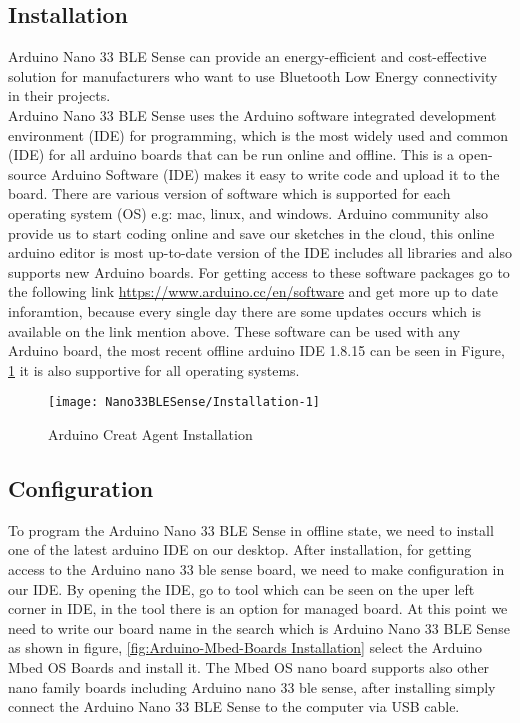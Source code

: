\subsection{Installation}

Arduino Nano 33 BLE Sense can provide an energy-efficient and cost-effective solution for manufacturers who want to use Bluetooth Low Energy connectivity in their projects.\\

Arduino Nano 33 BLE Sense uses the Arduino software integrated development environment (IDE) for programming, which is the most widely used and common (IDE) for all arduino boards that can be run online and offline. This is a open-source Arduino Software (IDE) makes it easy to write code and upload it to the board. There are various version of software which is supported for each operating system (OS) e.g: mac, linux, and windows. Arduino community also provide us to start coding online and save our sketches in the cloud, this online arduino editor is most up-to-date version of the IDE includes all libraries and also supports new Arduino boards. For getting access to these software packages go to the following link \url{https://www.arduino.cc/en/software}  and get more up to date inforamtion, because every single day there are some updates occurs which is available on the link mention above. These software can be used with any Arduino board, the most recent offline arduino IDE 1.8.15 can be seen in Figure, \ref{fig:arduino-creat-agent-installieren} it is also supportive for all operating systems.

\begin{figure}[h]
	\centering
	\texttt{[image: Nano33BLESense/Installation-1]}
	\caption{Arduino Creat Agent Installation}
	\label{fig:arduino-creat-agent-installieren}
\end{figure}


\subsection{Configuration}

To program the Arduino Nano 33 BLE Sense in offline state, we need to install one of the latest arduino IDE on our desktop. After installation, for getting access to the Arduino nano 33 ble sense board, we need to make configuration in our IDE. By opening the IDE, go to tool which can be seen on the uper left corner in IDE, in the tool there is an option for managed board. At this point we need to write our board name in the search which is Arduino Nano 33 BLE Sense as shown in figure, \ref {fig:Arduino-Mbed-Boards Installation} select the Arduino Mbed OS Boards and install it. The Mbed OS nano board supports also other nano family boards including Arduino nano 33 ble sense, after installing simply connect the Arduino Nano 33 BLE Sense to the computer via USB cable. 

